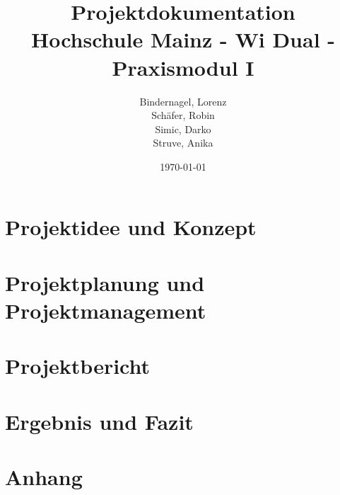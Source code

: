 \documentclass[a4paper, 12pt]{article}
\title{
    Projektdokumentation\\
    Hochschule Mainz - Wi Dual - Praxismodul I
}
\author{
    Bindernagel, Lorenz\\
    Schäfer, Robin\\
    Simic, Darko\\
    Struve, Anika
}
\date{\today}
\begin{document}
    \maketitle
    \newpage
    \tableofcontents
    \newpage


    \section{Projektidee und Konzept}\label{sec:idee-konzept}
    
    \newpage


    \section{Projektplanung und Projektmanagement}\label{sec:planung-management}
    
    \newpage


    \section{Projektbericht}\label{sec:projektberichts}
    
    \newpage


    \section{Ergebnis und Fazit}\label{sec:ergebnis-fazit}
    
    \newpage

    \appendix


    \section{Anhang}\label{sec:anhang}
    
\end{document}
